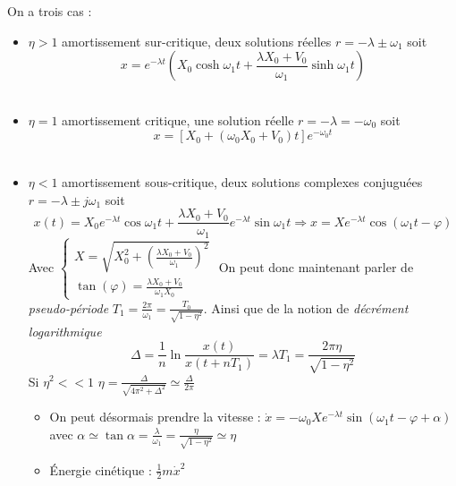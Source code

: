 \documentclass[../main.tex]{subfiles}
\begin{document}
On a trois cas : \begin{itemize}
    \item $\eta > 1$ amortissement sur-critique, deux solutions réelles $r = -\lambda \pm \omega_1$ soit \begin{equation}
        x = e^{-\lambda t} (X_0 \cosh{\omega_1 t} + \frac{\lambda X_0 + V_0}{\omega_1} \sinh{\omega_1 t})
    \end{equation}\\
    \item $\eta = 1 $ amortissement critique, une solution réelle $r = -\lambda = -\omega_0$ soit \begin{equation}
        x = \left[ X_0 + (\omega_0 X_0 +V_0)t\right] e^{-\omega_0 t}
    \end{equation}\\
    \item $\eta < 1$ amortissement sous-critique, deux solutions complexes conjuguées $r = -\lambda \pm j \omega_1$ soit \begin{equation}
        x(t) = X_0 e^{-\lambda t} \cos{\omega_1 t} + \frac{\lambda X_0 + V_0}{\omega_1} e^{-\lambda t} \sin{\omega_1 t} \Rightarrow x = X e^{-\lambda t} \cos{(\omega_1 t - \varphi)}
    \end{equation} 
    Avec $\begin{cases}
        X = \sqrt{X_0^2 + (\frac{\lambda X_0 + V_0}{\omega_1})^2}\\
        \tan(\varphi) = \frac{\lambda X_0 + V_0}{\omega_1 X_0}
    \end{cases}$ 
    On peut donc maintenant parler de \textit{pseudo-période} $T_1 = \frac{2\pi}{\omega_1} = \frac{T_0}{\sqrt{1-\eta^2}}$. Ainsi que de la notion de \textit{décrément logarithmique} \begin{equation}
    \Delta = \frac{1}{n} \ln{\frac{x(t)}{x(t+nT_1)}} = \lambda T_1 = \frac{2 \pi \eta}{\sqrt{1-\eta^2}}
    \end{equation}
    Si $\eta^2<<1$ $\eta = \frac{\Delta}{\sqrt{4\pi^2 + \Delta^2}} \simeq \frac{\Delta}{2\pi}$\begin{itemize}
        \item On peut désormais prendre la vitesse : $\dot{x} = -\omega_0 X e^{-\lambda t} \sin(\omega_1 t-\varphi + \alpha)$ avec $\alpha \simeq \tan \alpha = \frac{\lambda}{\omega_1} = \frac{\eta}{\sqrt{1-\eta^2}} \simeq \eta$\\
        \item Énergie cinétique : $\frac{1}{2}m \dot{x}^2$\\

\end{itemize}
\end{itemize}
\end{document}
